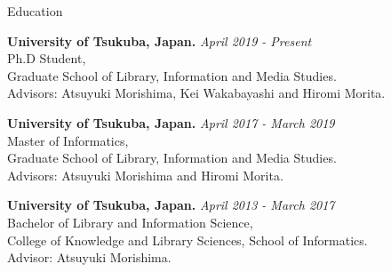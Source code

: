 \documentclass{resume} %
\begin{document}
\begin{rSection}{Education}

{\bf University of Tsukuba, Japan. } \hfill {\em April 2019 - Present}
\\ Ph.D Student,
\\ Graduate School of Library, Information and Media Studies.
\\ Advisors: Atsuyuki Morishima, Kei Wakabayashi and Hiromi Morita.

{\bf University of Tsukuba, Japan. } \hfill {\em April 2017 - March 2019}
\\ Master of Informatics,
\\ Graduate School of Library, Information and Media Studies.
\\ Advisors: Atsuyuki Morishima and Hiromi Morita.

{\bf University of Tsukuba, Japan. } \hfill {\em April 2013 - March 2017} 
\\ Bachelor of Library and Information Science,
\\ College of Knowledge and Library Sciences, School of Informatics.
\\ Advisor: Atsuyuki Morishima.
\end{rSection}









\end{document}
